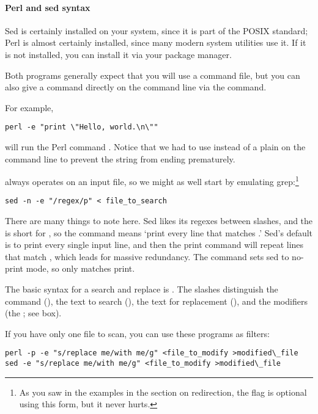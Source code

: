 \paragraph{Perl and sed syntax} 
Sed is certainly installed on your system, since it is part of the
POSIX standard; Perl is almost certainly installed, since many modern
system utilities use it. If it is not installed, you can install it via
your package manager.

Both programs generally expect that you will use a command file, but you
can also give a command directly on the command line via the 
command.

For example,
\begin{lstlisting}
perl -e "print \"Hello, world.\n\""
\end{lstlisting}
will run the Perl command . Notice
that we had to use  instead of a plain  on the
command line to prevent the string from ending prematurely.

 always operates on an input file, so we might as well start by 
emulating grep:\footnote{As you saw in the  examples in the
section on redirection, the  flag is optional using this form,
but it never hurts.}
\label{sedintro}
\begin{lstlisting}
sed -n -e "/regex/p" < file_to_search
\end{lstlisting}
There are many things to note here. Sed likes its regexes between
slashes, and the  is short for , so the command
 means `print every line that matches .'
Sed's default is to print every single input line, and then the print
command will repeat lines that match , which leads for massive
redundancy. The  command sets sed to no-print mode, so only
matches print.

The basic syntax for a search and replace is .
The slashes distinguish the command (), the text to search
(), the text for replacement (), and the
modifiers (the ; see box).

If you have only one file to scan, you can use these programs as
filters:
\begin{lstlisting}
perl -p -e "s/replace me/with me/g" <file_to_modify >modified\_file
sed -e "s/replace me/with me/g" <file_to_modify >modified\_file
\end{lstlisting}


